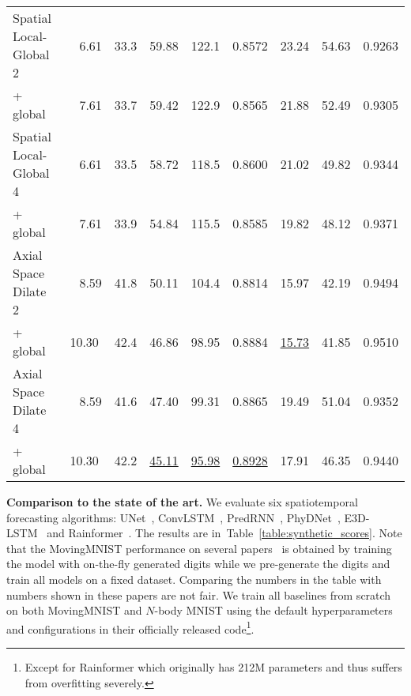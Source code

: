 \documentclass{article}
\newcommand{\bgray}[1]{\colorbox{myGray}{#1}}
\newcommand{\tabref}[1]{Table~\ref{#1}}
\renewcommand{\paragraph}[1]{\textbf{#1. }}
\def\nbody{$N$-body MNIST}
\begin{document}
\begin{table}[!tb]
\begin{center}
{\begin{tabular}{l|c|c|ccc|ccc}
	\midrule
	Spatial Local-Global 2  &\ \ 6.61       & 33.3     & 59.88				    & \bgray{122.1}         & \bgray{0.8572}	        & 23.24				& 54.63				& 0.9263				\\
	+ global                &\ \ 7.61	    & 33.7	    & \bgray{59.42}         & 122.9				    & 0.8565			        & \bgray{21.88}		& \bgray{52.49}		& \bgray{0.9305}		\\
	\midrule
	Spatial Local-Global 4  &\ \ 6.61	    & 33.5	    & 58.72				    & 118.5				    & \bgray{0.8600}	        & 21.02				& 49.82				& 0.9344				\\
	+ global                &\ \ 7.61	    & 33.9	    & \bgray{54.84}         & \bgray{115.5}         & 0.8585			        & \bgray{19.82}		& \bgray{48.12}		& \bgray{0.9371}		\\
	\midrule
	Axial Space Dilate 2    &\ \ 8.59	    & 41.8	    & 50.11				    & 104.4				    & 0.8814			        & 15.97				& 42.19				& 0.9494				\\
	+ global                & 10.30         & 42.4   	& \bgray{46.86}	        & \bgray{98.95}	        & \bgray{0.8884}	        & \bgray{\underline{15.73}}& \bgray{41.85}& \bgray{0.9510}		\\
	\midrule
	Axial Space Dilate 4    &\ \ 8.59	    & 41.6		& 47.40				    & 99.31				    & 0.8865			        & 19.49				& 51.04				& 0.9352				\\
	+ global                & 10.30	        & 42.2	    & \bgray{\underline{45.11}}& \bgray{\underline{95.98}}& \bgray{\underline{0.8928}}& \bgray{17.91}& \bgray{46.35}	& \bgray{0.9440}				\\
	\bottomrule[1.5pt]
	\end{tabular}
	} \end{center}
	\vspace{-1.5em}
\end{table}

\paragraph{Comparison to the state of the art}
We evaluate six spatiotemporal forecasting algorithms: UNet~\cite{veillette2020sevir}, ConvLSTM~\cite{shi2015convolutional}, PredRNN~\cite{wang2022predrnn}, PhyDNet~\cite{guen2020disentangling}, E3D-LSTM~\cite{wang2018eidetic} and Rainformer~\cite{bai2022rainformer}. The results are in~\tabref{table:synthetic_scores}. Note that the MovingMNIST performance on several papers~\cite{guen2020disentangling} is obtained by training the model with on-the-fly generated digits while we pre-generate the digits and train all models on a fixed dataset. Comparing the numbers in the table with numbers shown in these papers are not fair. We train all baselines from scratch on both MovingMNIST and \nbody{} using the default hyperparameters and configurations in their officially released code\footnote{Except for Rainformer which originally has 212M parameters and thus suffers from overfitting severely.}.
\end{document}
